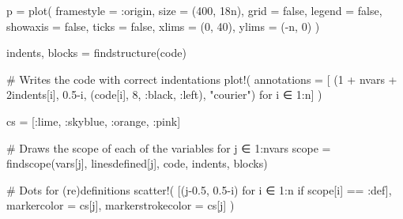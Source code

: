 \documentclass[
  letterpaper,
  DIV=11,
  numbers=noendperiod]{scrreprt}
\newenvironment{Shaded}{\begin{snugshade}}{\end{snugshade}}
\newcommand{\CommentTok}[1]{\textcolor[rgb]{0.37,0.37,0.37}{#1}}
\newcommand{\ConstantTok}[1]{\textcolor[rgb]{0.56,0.35,0.01}{#1}}
\newcommand{\ControlFlowTok}[1]{\textcolor[rgb]{0.00,0.23,0.31}{#1}}
\newcommand{\FloatTok}[1]{\textcolor[rgb]{0.68,0.00,0.00}{#1}}
\newcommand{\FunctionTok}[1]{\textcolor[rgb]{0.28,0.35,0.67}{#1}}
\newcommand{\NormalTok}[1]{\textcolor[rgb]{0.00,0.23,0.31}{#1}}
\newcommand{\OperatorTok}[1]{\textcolor[rgb]{0.37,0.37,0.37}{#1}}
\newcommand{\StringTok}[1]{\textcolor[rgb]{0.13,0.47,0.30}{#1}}
\begin{document}
\begin{Shaded}
\begin{Highlighting}[]
\NormalTok{    p }\OperatorTok{=} \FunctionTok{plot}\NormalTok{(}
\NormalTok{        framestyle }\OperatorTok{=} \OperatorTok{:}\NormalTok{origin,}
\NormalTok{        size }\OperatorTok{=}\NormalTok{ (}\FloatTok{400}\NormalTok{, }\FloatTok{18}\NormalTok{n),}
\NormalTok{        grid }\OperatorTok{=} \ConstantTok{false}\NormalTok{,}
\NormalTok{        legend }\OperatorTok{=} \ConstantTok{false}\NormalTok{,}
\NormalTok{        showaxis }\OperatorTok{=} \ConstantTok{false}\NormalTok{,}
\NormalTok{        ticks }\OperatorTok{=} \ConstantTok{false}\NormalTok{,}
\NormalTok{        xlims }\OperatorTok{=}\NormalTok{ (}\FloatTok{0}\NormalTok{, }\FloatTok{40}\NormalTok{),}
\NormalTok{        ylims }\OperatorTok{=}\NormalTok{ (}\OperatorTok{{-}}\NormalTok{n, }\FloatTok{0}\NormalTok{)}
\NormalTok{    )}

\NormalTok{    indents, blocks }\OperatorTok{=} \FunctionTok{findstructure}\NormalTok{(code)}

    \CommentTok{\# Writes the code with correct indentations}
    \FunctionTok{plot!}\NormalTok{(}
\NormalTok{        annotations }\OperatorTok{=}\NormalTok{ [}
\NormalTok{            (}\FloatTok{1} \OperatorTok{+}\NormalTok{ nvars }\OperatorTok{+} \FloatTok{2}\NormalTok{indents[i], }\FloatTok{0.5}\OperatorTok{{-}}\NormalTok{i, (code[i], }\FloatTok{8}\NormalTok{, }\OperatorTok{:}\NormalTok{black, }\OperatorTok{:}\NormalTok{left), }\StringTok{"courier"}\NormalTok{)}
\NormalTok{        for i }\OperatorTok{∈} \FloatTok{1}\OperatorTok{:}\NormalTok{n]}
\NormalTok{    )}

\NormalTok{    cs }\OperatorTok{=}\NormalTok{ [}\OperatorTok{:}\NormalTok{lime, }\OperatorTok{:}\NormalTok{skyblue, }\OperatorTok{:}\NormalTok{orange, }\OperatorTok{:}\NormalTok{pink]}

    \CommentTok{\# Draws the scope of each of the variables}
    \ControlFlowTok{for}\NormalTok{ j }\OperatorTok{∈} \FloatTok{1}\OperatorTok{:}\NormalTok{nvars}
\NormalTok{        scope }\OperatorTok{=} \FunctionTok{findscope}\NormalTok{(vars[j], linesdefined[j], code, indents, blocks)}
    
        \CommentTok{\# Dots for (re)definitions}
        \FunctionTok{scatter!}\NormalTok{(}
\NormalTok{            [(j}\OperatorTok{{-}}\FloatTok{0.5}\NormalTok{, }\FloatTok{0.5}\OperatorTok{{-}}\NormalTok{i)}
\NormalTok{                for i }\OperatorTok{∈} \FloatTok{1}\OperatorTok{:}\NormalTok{n if scope[i] }\OperatorTok{==} \OperatorTok{:}\NormalTok{def],}
\NormalTok{            markercolor }\OperatorTok{=}\NormalTok{ cs[j],}
\NormalTok{            markerstrokecolor }\OperatorTok{=}\NormalTok{ cs[j]}
\NormalTok{        )}
        

\end{Highlighting}
\end{Shaded}
\end{document}
